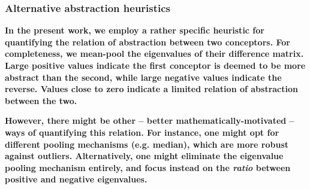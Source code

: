 \subsubsection{Alternative abstraction heuristics}

\textbf{In the present work, we employ a rather specific heuristic for quantifying the relation of abstraction between two conceptors. For completeness, we mean-pool the eigenvalues of their difference matrix. Large positive values indicate the first conceptor is deemed to be more abstract than the second, while large negative values indicate the reverse. Values close to zero indicate a limited relation of abstraction between the two.}

\textbf{However, there might be other -- better mathematically-motivated -- ways of quantifying this relation. For instance, one might opt for different pooling mechanisms (e.g. median), which are more robust against outliers. Alternatively, one might eliminate the eigenvalue pooling mechanism entirely, and focus instead on the \textit{ratio} between positive and negative eigenvalues.}